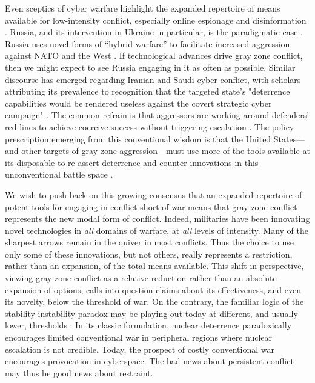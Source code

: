 \documentclass[11pt,letterpaper,pdftex,dvipsnames,table]{article}
\begin{document}
Even sceptics of cyber warfare highlight the expanded repertoire of means available for low-intensity conflict, especially online espionage and disinformation \citep{rid_cyberwarpeace_2013, jensen_fancybearsdigital_2019}. Russia, and its intervention in Ukraine in particular, is the paradigmatic case \citep{marten_putinchoicesexplaining_2015, thomas_russiamilitarystrategy_2015}. Russia uses novel forms of “hybrid warfare” to facilitate increased aggression against NATO and the West \citep{chivvis_hybridwarrussian_2017}. If technological advances drive gray zone conflict, then we might expect to see Russia engaging in it as often as possible. Similar discourse has emerged regarding Iranian and Saudi cyber conflict, with scholars attributing its prevalence to recognition that the targeted state's "deterrence capabilities would be rendered useless against the covert strategic cyber campaign" \citep[43]{farmanfarmaian_strategiesethicshybrid_2021}. The common refrain is that aggressors are working around defenders’ red lines to achieve coercive success without triggering escalation \citep{altman_advancingattackingstrategic_2018}. The policy prescription emerging from this conventional wisdom is that the United States---and other targets of gray zone aggression---must use more of the tools available at its disposable to re-assert deterrence and counter innovations in this unconventional battle space \citep{connell_deterringiranuse_2014, hicks_othermeanspart_2019, mccarthy_deterringrussiagray_2019}.

We wish to push back on this growing consensus that an expanded repertoire of potent tools for engaging in conflict short of war means that gray zone conflict represents the new modal form of conflict. Indeed, militaries have been innovating novel technologies in \textit{all} domains of warfare, at \textit{all} levels of intensity. Many of the sharpest arrows remain in the quiver in most conflicts. Thus the choice to use only some of these innovations, but not others, really represents a restriction, rather than an expansion, of the total means available. This shift in perspective, viewing gray zone conflict as a relative reduction rather than an absolute expansion of options, calls into question claims about its effectiveness, and even its novelty, below the threshold of war. On the contrary, the familiar logic of the stability-instability paradox may be playing out today at different, and usually lower, thresholds \citep{lindsay_coercioncyberspacestabilityinstability_2018}. In its classic formulation, nuclear deterrence paradoxically encourages limited conventional war in peripheral regions where nuclear escalation is not credible. Today, the prospect of costly conventional war encourages provocation in cyberspace. The bad news about persistent conflict may thus be good news about restraint. 
\end{document}
